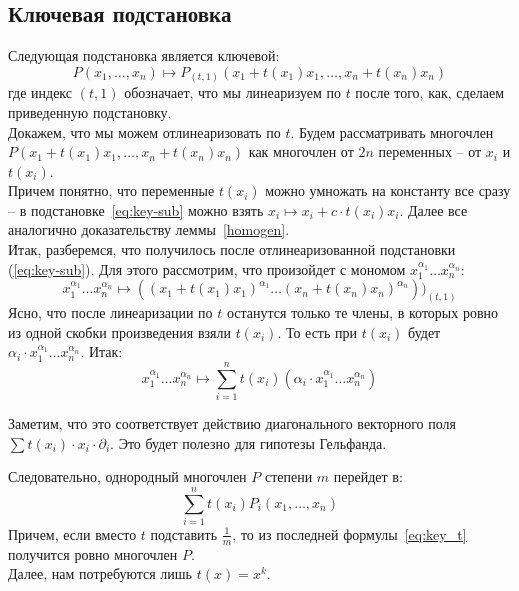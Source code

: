 \subsection{Ключевая подстановка}\label{subsec:key-substitution}
Следующая подстановка является ключевой:
\begin{equation}
    \label{eq:key-sub}
    P(x_1,\ldots,x_n)\mapsto P_{(t, 1)}\left(x_1+t(x_1)x_1,\ldots,x_n+t(x_n)x_n\right)
\end{equation}
где индекс $(t,1)$ обозначает, что мы линеаризуем по $t$ после того, как, сделаем приведенную подстановку.\\
Докажем, что мы можем отлинеаризовать по $t$.
Будем рассматривать многочлен $P(x_1+t(x_1)x_1,\ldots,x_n+t(x_n)x_n)$ как многочлен от $2n$ переменных -- от $x_i$ и $t(x_i)$.\\
Причем понятно, что переменные $t(x_i)$ можно умножать на константу все сразу -- в подстановке~\ref{eq:key-sub} можно взять $x_i\mapsto x_i+c\cdot t(x_i)x_i$.
Далее все аналогично доказательству леммы~\ref{homogen}.\\
Итак, разберемся, что получилось после отлинеаризованной подстановки (\ref{eq:key-sub}). Для этого рассмотрим, что произойдет с мономом $x_1^{\alpha_1}\ldots x_n^{\alpha_n}$:
\[x_1^{\alpha_1}\ldots x_n^{\alpha_n}\mapsto ((x_1+t(x_1)x_1)^{\alpha_1}\ldots (x_n+t(x_n)x_n)^{\alpha_n}))_{(t,1)}\]
Ясно, что после линеаризации по $t$ останутся только те члены, в которых ровно из одной скобки произведения взяли $t(x_i)$.
То есть при $t(x_i)$ будет $\alpha_i\cdot x_1^{\alpha_1}\ldots x_n^{\alpha_n}$.
Итак:
\begin{equation}
    \label{eq:key_monom}
    x_1^{\alpha_1}\ldots x_n^{\alpha_n}\mapsto\sum\limits_{i=1}^n t(x_i)(\alpha_i\cdot x_1^{\alpha_1}\ldots x_n^{\alpha_n})
\end{equation}
\begin{remark}
    Заметим, что это соответствует действию диагонального векторного поля $\sum t(x_i) \cdot x_i \cdot \partial_i$.
    Это будет полезно для гипотезы Гельфанда.
\end{remark}
\vskip 0.1in\noindent
Следовательно, однородный многочлен $P$ степени $m$ перейдет в:
\begin{equation}
    \label{eq:key_t}
    \sum\limits_{i=1}^n t(x_i)P_i(x_1,\ldots,x_n)
\end{equation}
Причем, если вместо $t$ подставить $\frac{1}{m}$, то из последней формулы~\eqref{eq:key_t} получится ровно многочлен $P$.\\
Далее, нам потребуются лишь $t(x)=x^k$.
